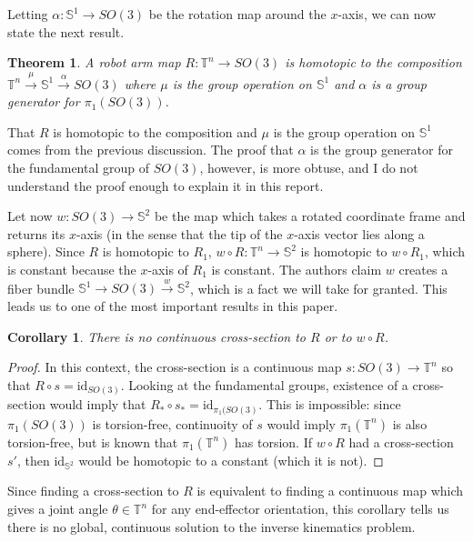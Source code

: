 \documentclass[12pt]{article}
\newtheorem{thm}{Theorem}
\newtheorem*{cor}{Corollary}
\theoremstyle{definition}
\begin{document}
Letting \(\alpha : \mathbb{S}^1 \rightarrow SO(3)\) be the rotation map around
the \(x\)-axis, we can now state the next result.
\begin{thm}
    A robot arm map \(R : \mathbb{T}^n \rightarrow SO(3)\) is homotopic to 
    the composition 
    \(\mathbb{T}^n \xrightarrow{\mu} \mathbb{S}^1 \xrightarrow{\alpha} SO(3)\)
    where \(\mu\) is the group operation on \(\mathbb{S}^1\) and \(\alpha\) is a
    group generator for \(\pi_1\left(SO(3)\right)\).
\end{thm}

That \(R\) is homotopic to the composition and \(\mu\) is the group operation on
\(\mathbb{S}^1\) comes from the previous discussion. The proof that \(\alpha\)
is the group generator for the fundamental group of \(SO(3)\), however, is more
obtuse, and I do not understand the proof enough to explain it in this report. 

Let now \(w : SO(3) \rightarrow \mathbb{S}^2\) be the map which takes a rotated
coordinate frame and returns its \(x\)-axis (in the sense that the tip of the
\(x\)-axis vector lies along a sphere).
Since \(R\) is homotopic to \(R_1\), 
\(w \circ R : \mathbb{T}^n \rightarrow \mathbb{S}^2\) is homotopic to 
\(w \circ R_1\), which is constant because the \(x\)-axis of \(R_1\) is
constant. The authors claim \(w\) creates a fiber bundle 
\(\mathbb{S}^1 \rightarrow SO(3) \xrightarrow{w} \mathbb{S}^2\), which is a fact
we will take for granted. This leads us to one of the most important results in
this paper.

\begin{cor}
    There is no continuous cross-section to \(R\) or to \(w \circ R\).
\end{cor}
\begin{proof}
    In this context, the cross-section is a continuous map 
    \(s : SO(3) \rightarrow \mathbb{T}^n\) so that \(R \circ s =
    \text{id}_{SO(3)}\). 
    Looking at the fundamental groups, existence of a cross-section would imply
    that \(R_* \circ s_* = \text{id}_{\pi_1(SO(3)}\). This is impossible:
    since \(\pi_1(SO(3))\) is torsion-free, continuoity of \(s\) would imply
    \(\pi_1(\mathbb{T}^n)\) is also torsion-free, but is known that
    \(\pi_1(\mathbb{T}^n)\) has torsion.
    If \(w \circ R\) had a cross-section \(s'\), then \(\text{id}_{\mathbb{S}^2}\)
    would be homotopic to a constant (which it is not).
\end{proof}

Since finding a cross-section to \(R\) is equivalent to finding a continuous map which
gives a joint angle \(\theta \in \mathbb{T}^n\) for any end-effector orientation,
this corollary tells us there is no global, continuous solution
to the inverse kinematics problem.
\end{document}
